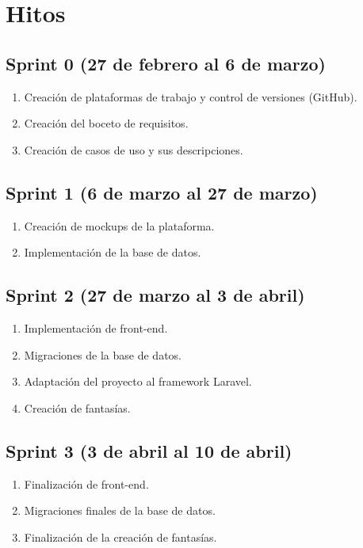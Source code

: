 \section{Hitos} %
\subsection{Sprint 0 (27 de febrero al 6 de marzo)}
\begin{enumerate}
	\item Creación de plataformas de trabajo y control de versiones (GitHub).
	\item Creación del boceto de requisitos.
	\item Creación de casos de uso y sus descripciones.
\end{enumerate}
\subsection{Sprint 1 (6 de marzo al 27 de marzo)}
\begin{enumerate}
	\item Creación de mockups de la plataforma.
	\item Implementación de la base de datos.
\end{enumerate}

\subsection{Sprint 2 (27 de marzo al 3 de abril)}
\begin{enumerate}
	\item Implementación de front-end.
	\item Migraciones de la base de datos.
	\item Adaptación del proyecto al framework Laravel.
	\item Creación de fantasías.
\end{enumerate}

\subsection{Sprint 3 (3 de abril al 10 de abril)}
\begin{enumerate}
	\item Finalización de front-end.
	\item Migraciones finales de la base de datos.
	\item Finalización de la creación de fantasías.
\end{enumerate}


